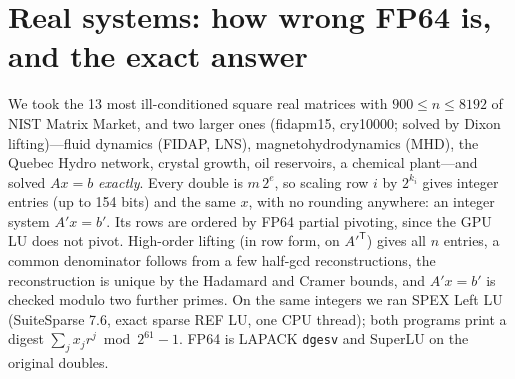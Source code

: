 \documentclass[11pt]{article}
\begin{document}
\section{Real systems: how wrong FP64 is, and the exact answer}\label{sec:real}
We took the 13 most ill-conditioned square real matrices with $900\le n\le 8192$ of NIST Matrix Market, and two larger ones (fidapm15, cry10000; solved by Dixon lifting)---fluid dynamics
(FIDAP, LNS), magnetohydrodynamics (MHD), the Quebec Hydro network, crystal growth, oil reservoirs, a chemical
plant---and solved $Ax=b$ \emph{exactly}. Every double is $m\,2^e$, so scaling row $i$ by $2^{k_i}$ gives integer entries (up
to 154 bits) and the same $x$, with no rounding anywhere: an integer system $A'x=b'$. Its rows are ordered by FP64 partial
pivoting, since the GPU LU does not pivot. High-order lifting (in row form, on $A'^{\mathsf T}$) gives all $n$ entries, a
common denominator follows from a few half-gcd reconstructions, the reconstruction is unique by the Hadamard and Cramer
bounds, and $A'x=b'$ is checked modulo two further primes. On the same
integers we ran SPEX Left LU~\cite{spex} (SuiteSparse 7.6, exact sparse REF LU, one CPU thread); both programs print a digest
$\sum_j x_j r^j \bmod 2^{61}-1$. FP64 is LAPACK \texttt{dgesv} and SuperLU on the original doubles.
\end{document}
